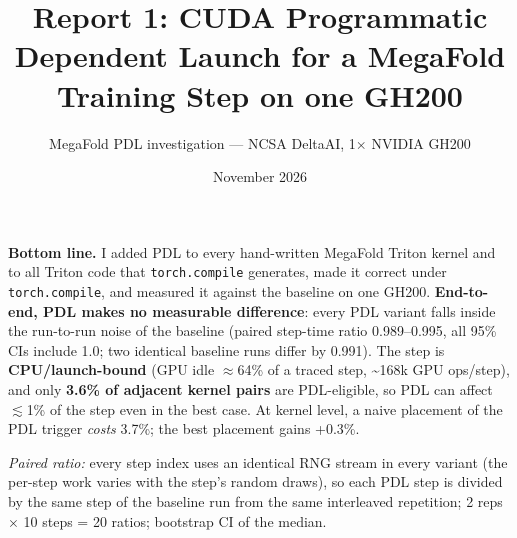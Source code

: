 \documentclass[10pt]{article}
\title{Report 1: CUDA Programmatic Dependent Launch for a MegaFold Training Step on one GH200}
\author{MegaFold PDL investigation --- NCSA DeltaAI, 1$\times$ NVIDIA GH200}
\date{November 2026}
\begin{document}
\maketitle

\textbf{Bottom line.} I added PDL to every hand-written MegaFold Triton kernel and to all Triton code that \texttt{torch.compile} generates, made it correct under \texttt{torch.compile}, and measured it against the baseline on one GH200. \textbf{End-to-end, PDL makes no measurable difference}: every PDL variant falls inside the run-to-run noise of the baseline (paired step-time ratio 0.989--0.995, all 95\% CIs include 1.0; two identical baseline runs differ by 0.991). The step is \textbf{CPU/launch-bound} (GPU idle $\approx$64\% of a traced step, \textasciitilde{}168k GPU ops/step), and only \textbf{3.6\% of adjacent kernel pairs} are PDL-eligible, so PDL can affect $\lesssim$1\% of the step even in the best case. At kernel level, a naive placement of the PDL trigger \emph{costs} 3.7\%; the best placement gains +0.3\%.


\begin{table}[H]\centering\small
{}
\end{table}

\emph{Paired ratio:} every step index uses an identical RNG stream in every variant (the per-step work varies with the step's random draws), so each PDL step is divided by the same step of the baseline run from the same interleaved repetition; 2 reps $\times$ 10 steps = 20 ratios; bootstrap CI of the median.
\end{document}
